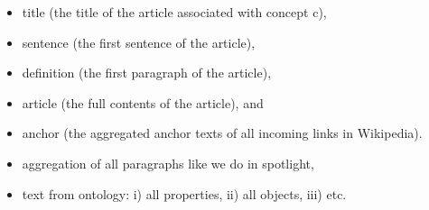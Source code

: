 \documentclass[10pt,a4paper]{article}
\begin{document}
\begin{itemize}
\item title (the title of the article associated with concept c), 
\item sentence (the first sentence of the article),
\item definition (the first paragraph of the article), 
\item article (the full contents of the article), and 
\item anchor (the aggregated anchor texts of all incoming links in Wikipedia).
\item aggregation of all paragraphs like we do in spotlight,
\item text from ontology: i) all properties, ii) all objects, iii) etc.
\end{itemize}



\end{document}
